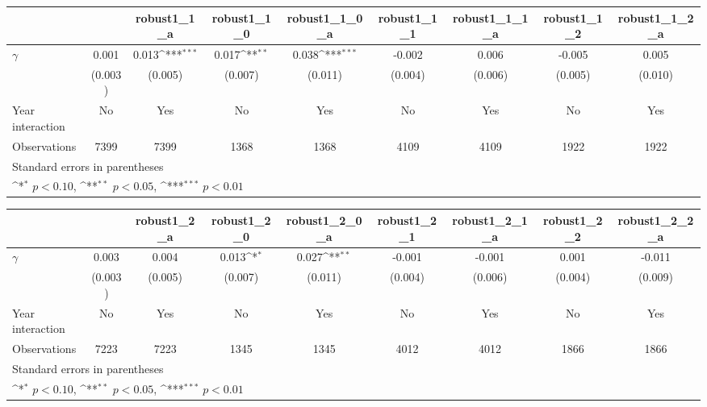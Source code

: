 {
\def\sym#1{\ifmmode^{#1}\else\(^{#1}\)\fi}
\begin{tabular}{l*{8}{c}}
\toprule
                &\multicolumn{1}{c}{}&\multicolumn{1}{c}{robust1\_1\_a}&\multicolumn{1}{c}{robust1\_1\_0}&\multicolumn{1}{c}{robust1\_1\_0\_a}&\multicolumn{1}{c}{robust1\_1\_1}&\multicolumn{1}{c}{robust1\_1\_1\_a}&\multicolumn{1}{c}{robust1\_1\_2}&\multicolumn{1}{c}{robust1\_1\_2\_a}\\
\midrule
$\gamma$        &    0.001         &    0.013\sym{***}&    0.017\sym{**} &    0.038\sym{***}&   -0.002         &    0.006         &   -0.005         &    0.005         \\
                &  (0.003)         &  (0.005)         &  (0.007)         &  (0.011)         &  (0.004)         &  (0.006)         &  (0.005)         &  (0.010)         \\
\addlinespace
Year interaction &       No         &      Yes         &       No         &      Yes         &       No         &      Yes         &       No         &      Yes         \\
\midrule
Observations    &     7399         &     7399         &     1368         &     1368         &     4109         &     4109         &     1922         &     1922         \\
\bottomrule
\multicolumn{9}{l}{\footnotesize Standard errors in parentheses}\\
\multicolumn{9}{l}{\footnotesize \sym{*} \(p<0.10\), \sym{**} \(p<0.05\), \sym{***} \(p<0.01\)}\\
\end{tabular}
}
{
\def\sym#1{\ifmmode^{#1}\else\(^{#1}\)\fi}
\begin{tabular}{l*{8}{c}}
\toprule
                &\multicolumn{1}{c}{}&\multicolumn{1}{c}{robust1\_2\_a}&\multicolumn{1}{c}{robust1\_2\_0}&\multicolumn{1}{c}{robust1\_2\_0\_a}&\multicolumn{1}{c}{robust1\_2\_1}&\multicolumn{1}{c}{robust1\_2\_1\_a}&\multicolumn{1}{c}{robust1\_2\_2}&\multicolumn{1}{c}{robust1\_2\_2\_a}\\
\midrule
$\gamma$        &    0.003         &    0.004         &    0.013\sym{*}  &    0.027\sym{**} &   -0.001         &   -0.001         &    0.001         &   -0.011         \\
                &  (0.003)         &  (0.005)         &  (0.007)         &  (0.011)         &  (0.004)         &  (0.006)         &  (0.004)         &  (0.009)         \\
\addlinespace
Year interaction &       No         &      Yes         &       No         &      Yes         &       No         &      Yes         &       No         &      Yes         \\
\midrule
Observations    &     7223         &     7223         &     1345         &     1345         &     4012         &     4012         &     1866         &     1866         \\
\bottomrule
\multicolumn{9}{l}{\footnotesize Standard errors in parentheses}\\
\multicolumn{9}{l}{\footnotesize \sym{*} \(p<0.10\), \sym{**} \(p<0.05\), \sym{***} \(p<0.01\)}\\
\end{tabular}
}

